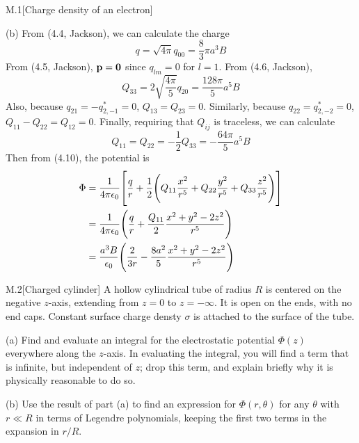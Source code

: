 \documentclass[12pt]{article}
\begin{document}
\begin{problem}{M.1}[Charge density of an electron]
\begin{solution}
(b) From (4.4, Jackson), we can calculate the charge
\begin{equation}
    q=\sqrt{4\pi}q_{00}=\frac{8}{3}\pi a^3B
\end{equation}
From (4.5, Jackson), $\vb{p}=\bm{0}$ since $q_{lm}=0$ for $l=1$. From (4.6,
Jackson), 
\begin{equation}
    Q_{33}=2\sqrt{\frac{4\pi}{5}}q_{20}=\frac{128\pi}{5}a^5B
\end{equation}
Also, because $q_{21}=-q_{2,-1}^\ast=0$, $Q_{13}=Q_{23}=0$. Similarly, because
$q_{22}=q_{2,-2}^\ast=0$, $Q_{11}-Q_{22}=Q_{12}=0$. Finally, requiring that
$Q_{ij}$ is traceless, we can calculate
\begin{equation}
    Q_{11}=Q_{22}=-\frac12Q_{33}=-\frac{64\pi}{5}a^5B 
\end{equation}
Then from (4.10), the potential is
\begin{align}
    \Phi
    &=\frac1{4\pi\epsilon_0}\qty[\frac{q}{r}+\frac12\qty(
    Q_{11}\frac{x^2}{r^5}+Q_{22}\frac{y^2}{r^5}+Q_{33}\frac{z^2}{r^5}
    )]\notag\\
    &=\frac1{4\pi\epsilon_0}\qty(\frac{q}{r}
    +\frac{Q_{11}}{2}\frac{x^2+y^2-2z^2}{r^5})\notag\\
    &=\frac{a^3B}{\epsilon_0}\qty(\frac{2}{3r}
    -\frac{8a^2}{5}\frac{x^2+y^2-2z^2}{r^5})
\end{align}
\end{solution}
\end{problem}
\newpage
\begin{problem}{M.2}[Charged cylinder]
A hollow cylindrical tube of radius $R$ is centered on the negative $z$-axis,
extending from $z=0$ to $z=-\infty$. It is open on the ends, with no end caps.
Constant surface charge densty $\sigma$ is attached to the surface of the tube.

(a) Find and evaluate an integral for the electrostatic potential $\Phi(z)$
everywhere along the $z$-axis. In evaluating the integral, you will find a term
that is infinite, but independent of $z$; drop this term, and explain briefly
why it is physically reasonable to do so.

(b) Use the result of part (a) to find an expression for $\Phi(r,\theta)$ for
any $\theta$ with $r\ll R$ in terms of Legendre polynomials, keeping the first
two terms in the expansion in $r /R$.
\begin{solution}
\end{solution}
\end{problem}
\end{document}
